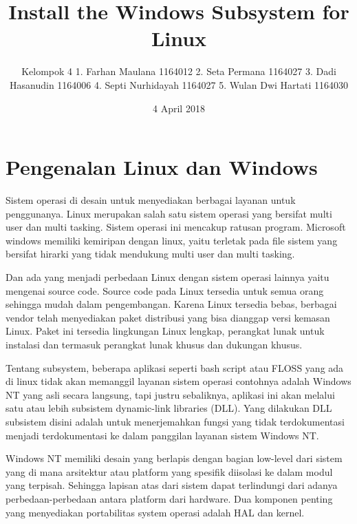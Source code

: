 \documentclass{article}
\title{Install the Windows Subsystem for Linux}
\author{Kelompok 4
1. Farhan Maulana       1164012
2. Seta Permana         1164027
3. Dadi Hasanudin       1164006
4. Septi Nurhidayah     1164027
5. Wulan Dwi Hartati    1164030}
\date{4 April 2018}
\begin{document}
\maketitle
\section{Pengenalan Linux dan Windows}
Sistem operasi di desain untuk menyediakan berbagai layanan untuk penggunanya. Linux merupakan salah satu sistem operasi yang bersifat multi user dan multi tasking. Sistem operasi ini mencakup ratusan program. Microsoft windows memiliki kemiripan dengan linux, yaitu terletak pada file sistem yang bersifat hirarki yang tidak mendukung multi user dan multi tasking.

Dan ada yang menjadi perbedaan Linux dengan sistem operasi lainnya yaitu mengenai source code. Source code pada Linux tersedia untuk semua orang sehingga mudah dalam pengembangan. Karena Linux tersedia bebas, berbagai vendor telah menyediakan paket distribusi yang bisa dianggap versi kemasan Linux. Paket ini tersedia lingkungan Linux lengkap, perangkat lunak untuk instalasi dan termasuk perangkat lunak khusus dan dukungan khusus.

Tentang subsystem, beberapa aplikasi  seperti bash script atau FLOSS yang ada di linux tidak akan memanggil layanan sistem operasi contohnya adalah Windows NT yang asli secara langsung, tapi justru sebaliknya, aplikasi ini akan melalui satu atau lebih subsistem dynamic-link libraries (DLL). Yang dilakukan DLL subsistem disini adalah untuk menerjemahkan fungsi yang tidak terdokumentasi menjadi terdokumentasi ke dalam panggilan layanan sistem Windows NT.

Windows NT memiliki desain yang berlapis dengan bagian low-level dari sistem yang di mana arsitektur atau platform yang spesifik diisolasi ke dalam modul yang terpisah. Sehingga lapisan atas dari sistem dapat terlindungi dari adanya perbedaan-perbedaan antara platform dari hardware. Dua komponen penting yang menyediakan portabilitas system operasi adalah HAL dan kernel.
\end{document}
